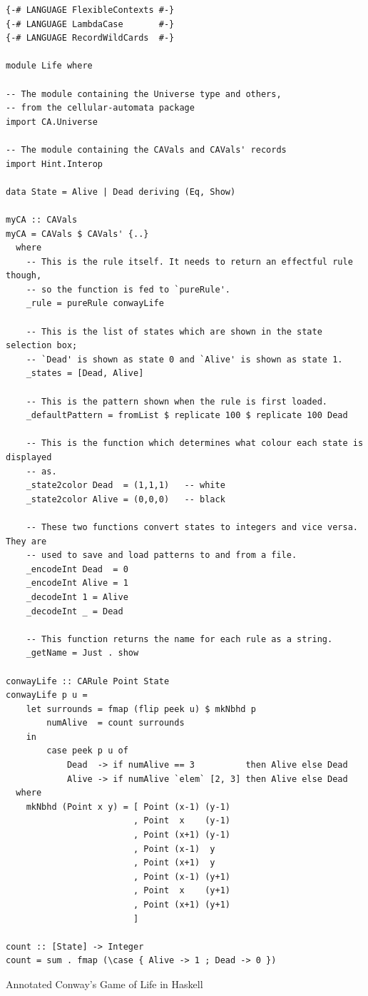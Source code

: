 \documentclass[oneside,a4paper]{memoir}
\newenvironment{longlisting}{\captionsetup{type=listing}}{}
\begin{document}
\begin{longlisting}
\begin{verbatim}
{-# LANGUAGE FlexibleContexts #-}
{-# LANGUAGE LambdaCase       #-}
{-# LANGUAGE RecordWildCards  #-}

module Life where

-- The module containing the Universe type and others,
-- from the cellular-automata package
import CA.Universe

-- The module containing the CAVals and CAVals' records
import Hint.Interop

data State = Alive | Dead deriving (Eq, Show)

myCA :: CAVals
myCA = CAVals $ CAVals' {..}
  where
    -- This is the rule itself. It needs to return an effectful rule though,
    -- so the function is fed to `pureRule'.
    _rule = pureRule conwayLife

    -- This is the list of states which are shown in the state selection box;
    -- `Dead' is shown as state 0 and `Alive' is shown as state 1.
    _states = [Dead, Alive]

    -- This is the pattern shown when the rule is first loaded.
    _defaultPattern = fromList $ replicate 100 $ replicate 100 Dead

    -- This is the function which determines what colour each state is displayed
    -- as.
    _state2color Dead  = (1,1,1)   -- white
    _state2color Alive = (0,0,0)   -- black

    -- These two functions convert states to integers and vice versa. They are
    -- used to save and load patterns to and from a file.
    _encodeInt Dead  = 0
    _encodeInt Alive = 1
    _decodeInt 1 = Alive
    _decodeInt _ = Dead

    -- This function returns the name for each rule as a string.
    _getName = Just . show

conwayLife :: CARule Point State
conwayLife p u =
    let surrounds = fmap (flip peek u) $ mkNbhd p
        numAlive  = count surrounds
    in
        case peek p u of
            Dead  -> if numAlive == 3          then Alive else Dead
            Alive -> if numAlive `elem` [2, 3] then Alive else Dead
  where
    mkNbhd (Point x y) = [ Point (x-1) (y-1)
                         , Point  x    (y-1)
                         , Point (x+1) (y-1)
                         , Point (x-1)  y
                         , Point (x+1)  y
                         , Point (x-1) (y+1)
                         , Point  x    (y+1)
                         , Point (x+1) (y+1)
                         ]

count :: [State] -> Integer
count = sum . fmap (\case { Alive -> 1 ; Dead -> 0 })
\end{verbatim}
\caption{Annotated Conway's Game of Life in Haskell}
\label{lst:agol}
\end{longlisting}
\end{document}
